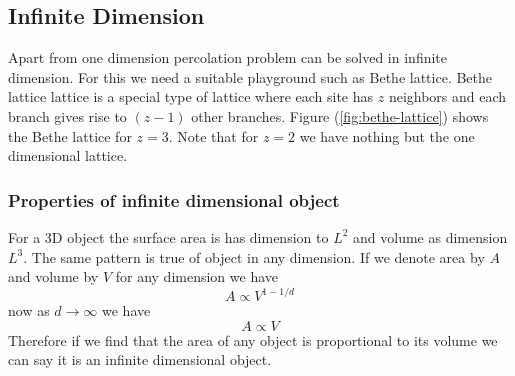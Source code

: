 	\subsection{Infinite Dimension}
	Apart from one dimension percolation problem can be solved in infinite dimension. For this we need a suitable playground such as Bethe lattice. Bethe lattice lattice is a special type of lattice  where each site has $z$ neighbors and each branch gives rise to $(z-1)$ other branches. Figure (\ref{fig:bethe-lattice}) shows the Bethe lattice for $z=3$. Note that for $z=2$ we have nothing but the one dimensional lattice. \subsubsection{Properties of infinite dimensional object}
	For a 3D object the surface area is has dimension to $L^2$ and volume as dimension $L^3$. The same pattern is true of object in any dimension. If we denote area by $A$ and volume by $V$ for any dimension we have
	\begin{equation}
		A \propto V^{1-1/d}
	\end{equation}
	now as $d \rightarrow \infty$ we have
	\begin{equation}
		A \propto V
	\end{equation}
	Therefore if we find that the area of any object is proportional to its volume we can say it is an infinite dimensional object.
